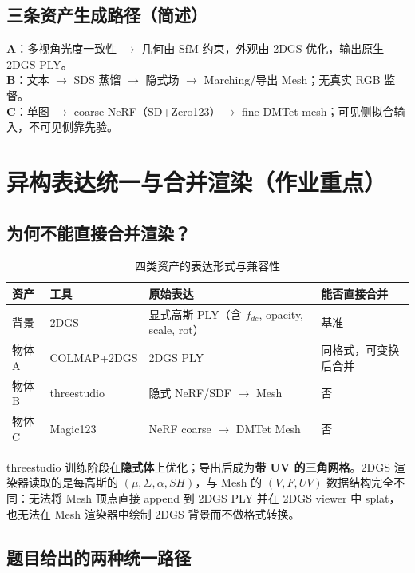 \documentclass[11pt]{article}
\begin{document}
\subsection{三条资产生成路径（简述）}
\textbf{A}：多视角光度一致性 $\rightarrow$ 几何由 SfM 约束，外观由 2DGS 优化，输出原生 2DGS PLY。\\
\textbf{B}：文本 $\rightarrow$ SDS 蒸馏 $\rightarrow$ 隐式场 $\rightarrow$ Marching/导出 Mesh；无真实 RGB 监督。\\
\textbf{C}：单图 $\rightarrow$ coarse NeRF（SD+Zero123）$\rightarrow$ fine DMTet mesh；可见侧拟合输入，不可见侧靠先验。

\section{异构表达统一与合并渲染（作业重点）}

\subsection{为何不能直接合并渲染？}

\begin{table}[h]
\centering
\caption{四类资产的表达形式与兼容性}
\small
\begin{tabular}{llll}
\toprule
资产 & 工具 & 原始表达 & 能否直接合并 \\
\midrule
背景 & 2DGS & 显式高斯 PLY（含 $f_{dc}$, opacity, scale, rot） & 基准 \\
物体 A & COLMAP+2DGS & 2DGS PLY & 同格式，可变换后合并 \\
物体 B & threestudio & 隐式 NeRF/SDF $\rightarrow$ Mesh & 否 \\
物体 C & Magic123 & NeRF coarse $\rightarrow$ DMTet Mesh & 否 \\
\bottomrule
\end{tabular}
\end{table}

threestudio 训练阶段在\textbf{隐式体}上优化；导出后成为\textbf{带 UV 的三角网格}。2DGS 渲染器读取的是每高斯的 $(\mu, \Sigma, \alpha, SH)$，与 Mesh 的 $(V, F, UV)$ 数据结构完全不同：无法将 Mesh 顶点直接 append 到 2DGS PLY 并在 2DGS viewer 中 splat，也无法在 Mesh 渲染器中绘制 2DGS 背景而不做格式转换。

\subsection{题目给出的两种统一路径}
\end{document}
